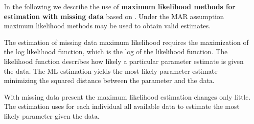 In the following we describe the use of \textbf{maximum likelihood methods for estimation with missing data} based on \cite{Enders06}. 
Under the MAR assumption maximum likelihood methods may be used to obtain valid estimates. \par
 The estimation of missing data maximum likelihood requires the maximization of the log likelihood function, which is the log of the likelihood function. The likelihood function describes how likely a particular parameter estimate is given the data. The ML estimation yields the most likely parameter estimate minimizing the squared distance between the parameter and the data. \par With missing data present the maximum likelihood estimation changes only little. The estimation uses for each individual all available data to estimate the most likely parameter given the data.

\endinput
